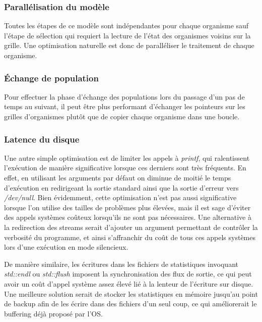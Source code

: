 \documentclass[a4paper, 10pt, twoside]{article}
\begin{document}
\subsubsection*{Parallélisation du modèle}

Toutes les étapes de ce modèle sont indépendantes pour chaque organisme sauf l'étape de sélection qui requiert la lecture de l'état des organismes voisins sur la grille. Une optimisation naturelle est donc de paralléliser le traitement de chaque organisme\label{parallel/orga}.

\subsubsection*{Échange de population}

Pour effectuer la phase d'échange des populations lors du passage d'un pas de temps au suivant, il peut être plus performant d'échanger les pointeurs sur les grilles d'organismes plutôt que de copier chaque organisme dans une boucle.

\subsubsection*{Latence du disque}

Une autre simple optimisation est de limiter les appels à \textit{printf}, qui ralentissent l'exécution de manière significative lorsque ces derniers sont très fréquents. En effet, en utilisant les arguments par défaut on diminue de moitié le temps d'exécution en redirigeant la sortie standard ainsi que la sortie d'erreur vers \textit{/dev/null}. Bien évidemment, cette optimisation n'est pas aussi significative lorsque l'on utilise des tailles de problèmes plus élevées, mais il est sage d'éviter des appels systèmes coûteux lorsqu'ils ne sont pas nécessaires. Une alternative à la redirection des streams serait d'ajouter un argument permettant de contrôler la verbosité du programme, et ainsi s'affranchir du coût de tous ces appels systèmes lors d'une exécution en mode silencieux.

De manière similaire, les écritures dans les fichiers de statistiques invoquant \textit{std::endl} ou \textit{std::flush} imposent la synchronisation des flux de sortie, ce qui peut avoir un coût d'appel système assez élevé lié à la lenteur de l'écriture sur disque. Une meilleure solution serait de stocker les statistiques en mémoire jusqu'au point de backup afin de les écrire dans des fichiers d'un seul coup, ce qui améliorerait le buffering déjà proposé par l'OS.
\end{document}
